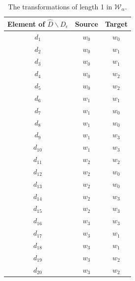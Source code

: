 \begin{table}[H]
	\centering
	\begin{tabular}{|c|c c|}
		\hline
		Element of $\hat{D} \backslash D_{\epsilon}$ & Source  & Target  \\
		\hline
		$d_{1}$                                      & $w_{0}$ & $w_{0}$ \\
		$d_{2}$                                      & $w_{0}$ & $w_{1}$ \\
		$d_{3}$                                      & $w_{0}$ & $w_{1}$ \\
		$d_{4}$                                      & $w_{0}$ & $w_{2}$ \\
		$d_{5}$                                      & $w_{0}$ & $w_{2}$ \\
		$d_{6}$                                      & $w_{1}$ & $w_{1}$ \\
		$d_{7}$                                      & $w_{1}$ & $w_{0}$ \\
		$d_{8}$                                      & $w_{1}$ & $w_{0}$ \\
		$d_{9}$                                      & $w_{1}$ & $w_{3}$ \\
		$d_{10}$                                     & $w_{1}$ & $w_{3}$ \\
		$d_{11}$                                     & $w_{2}$ & $w_{2}$ \\
		$d_{12}$                                     & $w_{2}$ & $w_{0}$ \\
		$d_{13}$                                     & $w_{2}$ & $w_{0}$ \\
		$d_{14}$                                     & $w_{2}$ & $w_{3}$ \\
		$d_{15}$                                     & $w_{2}$ & $w_{3}$ \\
		$d_{16}$                                     & $w_{3}$ & $w_{3}$ \\
		$d_{17}$                                     & $w_{3}$ & $w_{1}$ \\
		$d_{18}$                                     & $w_{3}$ & $w_{1}$ \\
		$d_{19}$                                     & $w_{3}$ & $w_{2}$ \\
		$d_{20}$                                     & $w_{3}$ & $w_{2}$ \\
		\hline
	\end{tabular}
	\caption{The transformations of length 1 in $\mathscr{W}_{\alpha}$.}
	\label{tab:2x2_gridworld_length_1_transformations}
\end{table}

